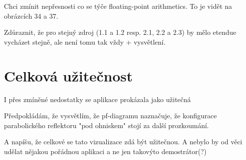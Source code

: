 Chci zmínit nepřesnosti co se týče floating-point arithmetics. To je vidět na obrázcích 34 a 37.

Zdůraznit, že pro stejný zdroj (1.1 a 1.2 resp. 2.1, 2.2 a 2.3) by mělo etendue vycházet stejně, ale není tomu tak vždy + vysvětlení.

\section{Celková užitečnost}

I přes zmíněné nedostatky se aplikace prokázala jako užitečná

Předpokládám, že vysvětlím, že pf-diagramu naznačuje, že konfigurace parabolického reflektoru "pod ohniskem" stojí za další prozkoumání.


A napíšu, že celkové se tato vizualizace zdá být užitečnou. A nebylo by od věci udělat nějakou pořádnou aplikaci a ne jen takovýto demostrátor(?)
